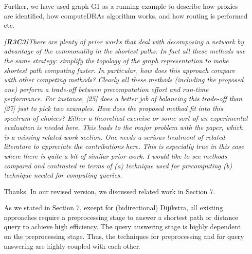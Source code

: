 \documentclass[11pt]{letter}
\newcommand{\vs}{\vspace{1ex}}
\newcommand{\svs}{\vspace{0.36ex}}
\begin{document}
Further, we have used graph G1 as a running example to describe how proxies are identified, how computeDRAs algorithm works, and how routing is performed etc.


\vs
\noindent
{\em{\bf[R3C3]}There are plenty of prior works that deal with decomposing a network by advantage of the commonality in the shortest paths. In fact all these methods use the same strategy: simplify the topology of the graph representation to make shortest path computing faster. In particular, how does this approach compare with other competing methods? Clearly all these methods (including the proposed one) perform a trade-off between precomputation effort and run-time performance. For instance, [25] does a better job of balancing this trade-off than [27] just to pick two examples. How does the proposed method fit into this spectrum of choices? Either a theoretical exercise or some sort of an experimental evaluation is needed here. This leads to the major problem with the paper, which is a missing related work section.  One needs a serious treatment of related literature to appreciate the contributions here. This is especially true in this case where there is quite a bit of similar prior work. I would like to see methods compared and contrasted in terms of (a) technique used for precomputing (b) technique needed for computing queries.}
\svs

Thanks. In our revised version, we discussed related work in Section 7.

As we stated in Section 7, except for (bidirectional) Dijikstra, all existing approaches require a preprocessing stage to answer a shortest path or distance query to achieve high efficiency. The query answering stage is highly dependent on the preprocessing stage. Thus, the techniques for preprocessing and for query answering are highly coupled with each other. 


\vs{}
\svs
\end{document}
